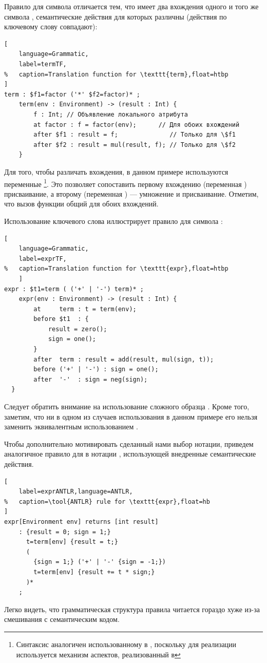 Правило для символа  отличается тем, что имеет два вхождения одного и того же символа , семантические действия для которых различны (действия по ключевому слову  совпадают):
\begin{lstlisting}[
	language=Grammatic,	
	label=termTF,
%	caption=Translation function for \texttt{term},float=htbp
]
term : $f1=factor ('*' $f2=factor)* ;         
	term(env : Environment) -> (result : Int) {  
		f : Int; // Объявление локального атрибута
		at factor : f = factor(env);      // Для обоих вхождений
		after $f1 : result = f;              // Только для \$f1
		after $f2 : result = mul(result, f); // Только для \$f2
	}
\end{lstlisting}
Для того, чтобы различать вхождения, в данном примере используются переменные \footnote{Синтаксис аналогичен использованному в \GRM{}, поскольку для реализации \ATF{} используется механизм аспектов, реализованный в \GRM{}}. Это позволяет сопоставить первому вхождению (переменная ) присваивание, а второму (переменная ) --- умножение и присваивание. Отметим, что вызов функции  общий для обоих вхождений.

Использование ключевого слова  иллюстрирует правило для символа :
\begin{lstlisting}[
	language=Grammatic,	
	label=exprTF,
%	caption=Translation function for \texttt{expr},float=htbp
	]
expr : $t1=term ( ('+' | '-') term)* ;         
	expr(env : Environment) -> (result : Int) {  
  		at     term : t = term(env);
		before $t1  : {
			result = zero();
			sign = one();
		}
		after  term : result = add(result, mul(sign, t));
		before ('+' | '-') : sign = one();
		after  '-'  : sign = neg(sign);
  }
\end{lstlisting}
Следует обратить внимание на использование сложного образца . Кроме того, заметим, что ни в одном из случаев использования  в данном примере его нельзя заменить эквивалентным использованием .

Чтобы дополнительно мотивировать сделанный нами выбор нотации, приведем аналогичное правило для  в нотации , использующей внедренные семантические действия.
\begin{lstlisting}[
	label=exprANTLR,language=ANTLR,
%	caption=\tool{ANTLR} rule for \texttt{expr},float=hb
]
expr[Environment env] returns [int result] 
	: {result = 0; sign = 1;} 
	  t=term[env] {result = t;}
	  (
 	    {sign = 1;} ('+' | '-' {sign = -1;}) 
	    t=term[env] {result += t * sign;}
	  )* 
	;         
\end{lstlisting}
Легко видеть, что грамматическая структура правила читается гораздо хуже из-за смешивания с семантическим кодом.

